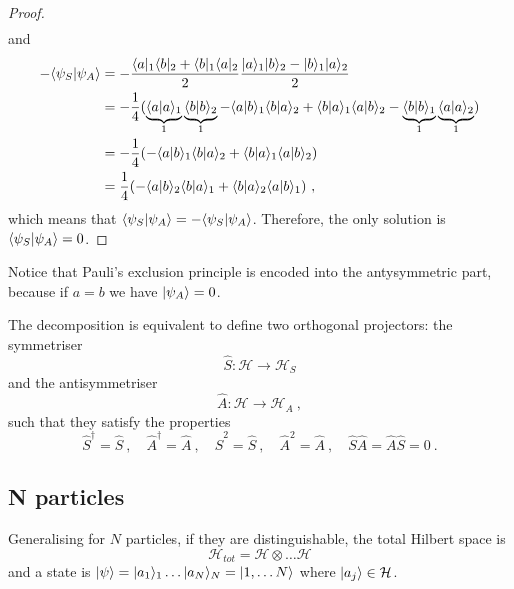 \begin{proof}
\begin{equation*}
\begin{aligned}
    \end{aligned}
    \end{equation*}
    and 
    \begin{equation*}
    \begin{aligned}
        - \langle\psi_S\vert\psi_A\rangle & = - \frac{\langle a\vert_1\langle b\vert_2 + \langle b\vert_1\langle a\vert_2}{2} \frac{\vert a\rangle_1 \vert b\rangle_2 - \vert b\rangle_1 \vert a\rangle_2}{2} \\ & = - \frac{1}{4} (\underbrace{\langle a\vert a\rangle_1}_1 \underbrace{\langle b\vert b\rangle_2}_1 - \langle a\vert b\rangle_1 \langle b\vert a\rangle_2 + \langle b\vert a\rangle_1 \langle a\vert b\rangle_2 - \underbrace{\langle b\vert b\rangle_1}_1 \underbrace{\langle a\vert a\rangle_2}_1) \\ & = - \frac{1}{4} (- \langle a\vert b\rangle_1 \langle b\vert a\rangle_2 + \langle b\vert a\rangle_1 \langle a\vert b\rangle_2) \\ & = \frac{1}{4} (- \langle a\vert b\rangle_2 \langle b\vert a\rangle_1 + \langle b\vert a\rangle_2 \langle a\vert b\rangle_1 ) ~,
    \end{aligned}
    \end{equation*}
    which means that $\langle\psi_S\vert\psi_A\rangle = - \langle\psi_S\vert\psi_A\rangle$. Therefore, the only solution is $\langle\psi_S\vert\psi_A\rangle = 0$.
    \end{proof}
    
    Notice that Pauli's exclusion principle is encoded into the antysymmetric part, because if $a = b$ we have $\vert\psi_A\rangle = 0$.

    The decomposition is equivalent to define two orthogonal projectors: the symmetriser 
    \begin{equation*}
        \hat S \colon \mathcal H \rightarrow \mathcal H_S
    \end{equation*}
    and the antisymmetriser 
    \begin{equation*}
        \hat A \colon \mathcal H \rightarrow \mathcal H_A ~,
    \end{equation*}
    such that they satisfy the properties 
    \begin{equation}\label{projprop}
        \hat S^\dagger = \hat S~, \quad \hat A^\dagger = \hat A~, \quad \hat S^2 = \hat S~, \quad \hat A^2 = \hat A~, \quad \hat S \hat A = \hat A \hat S = 0 ~.
    \end{equation}

\subsection{N particles}

    Generalising for $N$ particles, if they are distinguishable, the total Hilbert space is 
    \begin{equation*}
        \mathcal H_{tot} = \mathcal H \otimes \ldots \mathcal H
    \end{equation*}
    and a state is $\vert\psi\rangle = \vert a_1\rangle_1 \ldots \vert a_N\rangle_N = \vert1, \ldots N\rangle$ where $\vert a_j\rangle \in \mathcal H$. 

